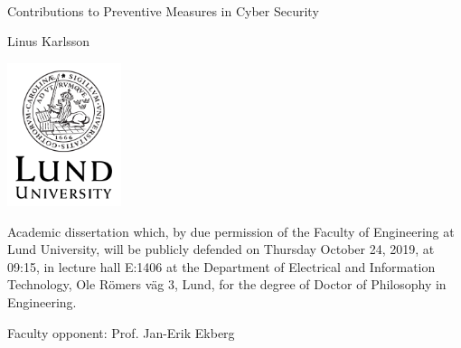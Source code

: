\documentclass[11pt]{book}
\newcommand{\myName}{Linus Karlsson}
\newcommand{\myMainTitle}{Contributions to Preventive Measures in Cyber Security}
\newcommand{\myAdvisors}{Martin Hell, Paul Stankovski Wagner, Ben Smeets}
\newcommand{\myOpponent}{Prof. Jan-Erik Ekberg}
\newcommand{\myDefenceAnnouncement}{%
	Academic dissertation which, by due permission of the Faculty of Engineering at Lund University, will be publicly defended on Thursday October 24, 2019, at 09:15, in lecture hall E:1406 at the Department of Electrical and Information Technology, Ole Römers väg 3, Lund, for the degree of Doctor of Philosophy in Engineering. }
\newcommand{\myDefenceAnnouncementSwedish}{%
	Akademisk avhandling, som med godkännande av tekniska fakulteten vid Lunds universitet, kommer att offentligen försvaras torsdagen den 24 oktober 2019, kl. 09.15 i hörsal E:1406 vid institutionen för elektro- och informationsteknik, Ole Römers väg 3, Lund, för avläggande av teknologie doktorsexamen.}
\begin{document}
\thispagestyle{empty} %
~
\vfill
\begin{center}
	{\begin{spacing}{0.9} \Huge \myMainTitle \end{spacing}}
	
	\vfill
	{\large \myName}
	
	\vfill
	\includegraphics[width=0.25\textwidth]{../figures/LundUniversity_C2line_BLACK}
	
	\vspace{10mm}
	\vspace{1cm}
\end{center}
{\footnotesize
	\myDefenceAnnouncement
	
	\noindent Faculty opponent: \myOpponent
}

%	
\vfill


%

\newpage \thispagestyle{empty} %


\end{document}

